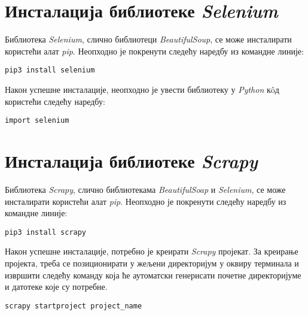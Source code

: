 \documentclass[12pt,oneside]{memoir}
\begin{document}
\chapter{Инсталација библиотеке \textit{Selenium}}
\label{app:instalacijaSelenium}
Библиотека \textit{Selenium}, слично библиотеци \textit{BeautifulSoup}, се може инсталирати користећи алат \textit{pip}. Неопходно је покренути следећу наредбу из командне линије:
\begin{verbatim}
pip3 install selenium
\end{verbatim}
Након успешне инсталације, неопходно је увести библиотеку у \textit{Python} кôд користећи следећу наредбу:
\begin{verbatim}
import selenium
\end{verbatim}

\chapter{Инсталација библиотеке \textit{Scrapy}}
\label{app:instalacijaScrapy}
Библиотека \textit{Scrapy}, слично библиотекама \textit{BeautifulSoap} и \textit{Selenium}, се може инсталирати користећи алат \textit{pip}. Неопходно је покренути следећу наредбу из командне линије:
\begin{verbatim}
pip3 install scrapy
\end{verbatim}

Након успешне инсталације, потребно је креирати \textit{Scrapy} пројекат.
За креирање пројекта, треба се позиционирати у жељени директоријум у оквиру терминала и извршити следећу команду која ће аутоматски генерисати почетне директоријуме и датотеке које су потребне.
\begin{verbatim}
scrapy startproject project_name
\end{verbatim}


\literatura

\backmatter
\end{document}
